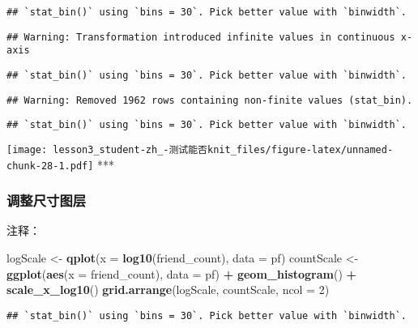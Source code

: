 \documentclass[]{article}
\newenvironment{Shaded}{\begin{snugshade}}{\end{snugshade}}
\newcommand{\DataTypeTok}[1]{\textcolor[rgb]{0.13,0.29,0.53}{#1}}
\newcommand{\DecValTok}[1]{\textcolor[rgb]{0.00,0.00,0.81}{#1}}
\newcommand{\KeywordTok}[1]{\textcolor[rgb]{0.13,0.29,0.53}{\textbf{#1}}}
\newcommand{\NormalTok}[1]{#1}
\newcommand{\OperatorTok}[1]{\textcolor[rgb]{0.81,0.36,0.00}{\textbf{#1}}}
\newcommand{\StringTok}[1]{\textcolor[rgb]{0.31,0.60,0.02}{#1}}
\begin{document}
\begin{verbatim}
## `stat_bin()` using `bins = 30`. Pick better value with `binwidth`.
\end{verbatim}

\begin{verbatim}
## Warning: Transformation introduced infinite values in continuous x-axis
\end{verbatim}

\begin{verbatim}
## `stat_bin()` using `bins = 30`. Pick better value with `binwidth`.
\end{verbatim}

\begin{verbatim}
## Warning: Removed 1962 rows containing non-finite values (stat_bin).
\end{verbatim}

\begin{verbatim}
## `stat_bin()` using `bins = 30`. Pick better value with `binwidth`.
\end{verbatim}

\texttt{[image: lesson3\_student-zh\_-测试能否knit\_files/figure-latex/unnamed-chunk-28-1.pdf]}
***

\subsubsection{调整尺寸图层}

注释：

\begin{Shaded}
\begin{Highlighting}[]
\NormalTok{logScale <-}\StringTok{ }\KeywordTok{qplot}\NormalTok{(}\DataTypeTok{x =} \KeywordTok{log10}\NormalTok{(friend_count), }\DataTypeTok{data =}\NormalTok{ pf)}
\NormalTok{countScale <-}\StringTok{ }\KeywordTok{ggplot}\NormalTok{(}\KeywordTok{aes}\NormalTok{(}\DataTypeTok{x =}\NormalTok{ friend_count), }\DataTypeTok{data =}\NormalTok{ pf) }\OperatorTok{+}\StringTok{ }
\StringTok{  }\KeywordTok{geom_histogram}\NormalTok{() }\OperatorTok{+}\StringTok{ }
\StringTok{  }\KeywordTok{scale_x_log10}\NormalTok{()}
\KeywordTok{grid.arrange}\NormalTok{(logScale, countScale, }\DataTypeTok{ncol =} \DecValTok{2}\NormalTok{)}
\end{Highlighting}
\end{Shaded}

\begin{verbatim}
## `stat_bin()` using `bins = 30`. Pick better value with `binwidth`.
\end{verbatim}
\end{document}
